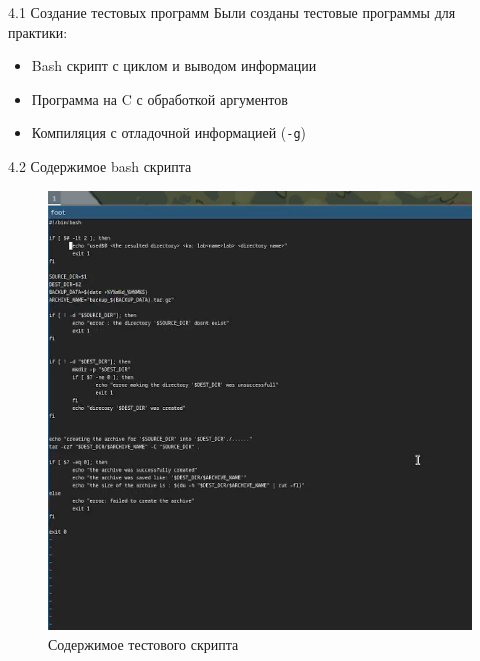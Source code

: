 \documentclass[
  ignorenonframetext,
  aspectratio=169,
  russian,
]{beamer}
\providecommand{\tightlist}{%
  \setlength{\itemsep}{0pt}\setlength{\parskip}{0pt}}
\begin{document}
\begin{frame}[fragile]{4.1 Создание тестовых программ}
\label{ux441ux43eux437ux434ux430ux43dux438ux435-ux442ux435ux441ux442ux43eux432ux44bux445-ux43fux440ux43eux433ux440ux430ux43cux43c}
Были созданы тестовые программы для практики:

\begin{itemize}[<+->]
\tightlist
\item
  Bash скрипт с циклом и выводом информации
\item
  Программа на C с обработкой аргументов
\item
  Компиляция с отладочной информацией (\texttt{-g})
\end{itemize}
\end{frame}

\begin{frame}{4.2 Содержимое bash скрипта}
\label{ux441ux43eux434ux435ux440ux436ux438ux43cux43eux435-bash-ux441ux43aux440ux438ux43fux442ux430}
\begin{figure}[H]

{\centering \includegraphics[width=0.7\linewidth,height=\textheight,keepaspectratio]{image/content1.png}

}

\caption{Содержимое тестового скрипта}

\end{figure}%
\end{frame}
\end{document}
